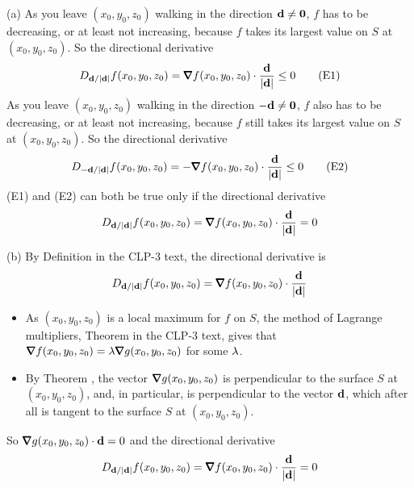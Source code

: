 \begin{solution}
(a) As you leave $(x_0,y_0,z_0)$ walking in the direction $\mathbf{d}\ne\mathbf{0}$,
$f$ has to be decreasing, or at  least not increasing, because $f$ takes 
its largest value on $S$ at $(x_0,y_0,z_0)$. So the directional derivative
\begin{equation*}
D_{\vd/|\vd|}f(x_0,y_0,z_0)=\vnabla f(x_0,y_0,z_0)\cdot\frac{\vd}{|\vd|}\le 0
\tag{E1}\end{equation*}
As you leave $(x_0,y_0,z_0)$ walking in the direction $-\mathbf{d}\ne\mathbf{0}$,
$f$ also has to be decreasing, or at  least not increasing, because $f$ 
still takes its largest value on $S$ at $(x_0,y_0,z_0)$. So the 
directional derivative
\begin{equation*}
D_{-\vd/|\vd|}f(x_0,y_0,z_0)=-\vnabla f(x_0,y_0,z_0)\cdot\frac{\vd}{|\vd|}\le 0
\tag{E2}\end{equation*}
(E1) and (E2) can both be true only if the directional derivative
\begin{equation*}
D_{\vd/|\vd|}f(x_0,y_0,z_0)=\vnabla f(x_0,y_0,z_0)\cdot\frac{\vd}{|\vd|} = 0
\end{equation*}

(b) By Definition  in the CLP-3 text, the 
directional derivative is
\begin{equation*}
D_{\vd/|\vd|}f(x_0,y_0,z_0)=\vnabla f(x_0,y_0,z_0)\cdot\frac{\vd}{|\vd|}
\end{equation*}
\begin{itemize}
\item
As $(x_0,y_0,z_0)$ is a local maximum for $f$ on $S$, the method of
Lagrange multipliers, Theorem  in the CLP-3 text, 
gives that $\vnabla f(x_0,y_0,z_0) =\la\vnabla g(x_0,y_0,z_0)$ for some $\lambda$.
\item
By Theorem , the vector $\vnabla g(x_0,y_0,z_0)$
is perpendicular to the surface $S$ at $(x_0,y_0,z_0)$, and, in particular,
is perpendicular to the vector $\mathbf{d}$, which after all is tangent to the surface 
$S$ at $(x_0,y_0,z_0)$. 
\end{itemize}
So $\vnabla g(x_0,y_0,z_0)\cdot\vd=0$ and the directional derivative
\begin{equation*}
D_{\vd/|\vd|}f(x_0,y_0,z_0)=\vnabla f(x_0,y_0,z_0)\cdot\frac{\vd}{|\vd|}=0
\end{equation*}
\end{solution}





